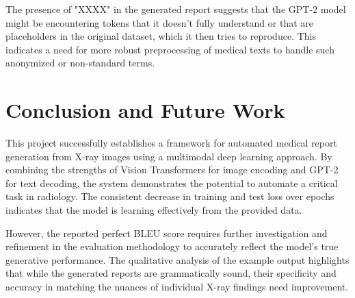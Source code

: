 \documentclass[a4paper, 12pt]{article}
\begin{document}
\begin{itemize}
The presence of "XXXX" in the generated report suggests that the GPT-2 model might be encountering tokens that it doesn't fully understand or that are placeholders in the original dataset, which it then tries to reproduce. This indicates a need for more robust preprocessing of medical texts to handle such anonymized or non-standard terms.

\section{Conclusion and Future Work}
\label{sec:conclusion}

This project successfully establishes a framework for automated medical report generation from X-ray images using a multimodal deep learning approach. By combining the strengths of Vision Transformers for image encoding and GPT-2 for text decoding, the system demonstrates the potential to automate a critical task in radiology. The consistent decrease in training and test loss over epochs indicates that the model is learning effectively from the provided data.

However, the reported perfect BLEU score requires further investigation and refinement in the evaluation methodology to accurately reflect the model's true generative performance. The qualitative analysis of the example output highlights that while the generated reports are grammatically sound, their specificity and accuracy in matching the nuances of individual X-ray findings need improvement.


\end{itemize}
\end{document}
